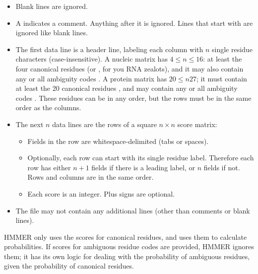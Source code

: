 \begin{itemize}

\item Blank lines are ignored.

\item A \mono{\#} indicates a comment. Anything after it is
  ignored. Lines that start with \mono{\#} are ignored like blank
  lines.

\item The first data line is a header line, labeling each column with
  $n$ single residue characters (case-insensitive). A nucleic matrix
  has $4 \leq n \leq 16$: at least the four canonical residues
   (or , for you RNA zealots), and it may also
  contain any or all ambiguity codes . A protein
  matrix has $20 \leq n 27$; it must contain at least the 20 canonical
  residues , and may contain any or all
  ambiguity codes . These residues can be in any order,
  but the rows must be in the same order as the columns.

\item The next $n$ data lines are the rows of a square $n \times n$
  score matrix:

\begin{itemize}
\item  Fields in the row are whitespace-delimited (tabs or
       spaces).

\item Optionally, each row can start with its single residue label.
  Therefore each row has either $n+1$ fields if there is a leading
  label, or $n$ fields if not. Rows and columns are in the same order.

\item  Each score is an integer. Plus signs are optional. 
\end{itemize}

\item The file may not contain any additional lines (other than
  comments or blank lines).
\end{itemize}

HMMER only uses the scores for canonical residues, and uses them to
calculate probabilities. If scores for ambiguous residue codes are
provided, HMMER ignores them; it has its own logic for dealing with
the probability of ambiguous residues, given the probability of
canonical residues.






  
